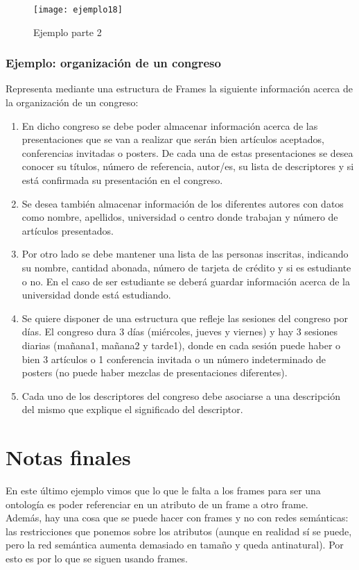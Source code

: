 \documentclass[12pt]{article}
\begin{document}
\begin{figure}[H]
\centering
\texttt{[image: ejemplo18]}
\caption{Ejemplo parte 2}
\label{fig:ejemplo18}
\end{figure}

\subsubsection{Ejemplo: organización de un congreso}
Representa mediante una estructura de Frames la siguiente información acerca de la organización de un congreso:
\begin{enumerate}
\item En dicho congreso se debe poder almacenar información acerca de las presentaciones que se van a realizar que serán bien artículos aceptados, conferencias invitadas o posters. De cada una de estas presentaciones se desea conocer su títulos, número de referencia, autor/es, su lista de descriptores y si está confirmada su presentación en el congreso.
\item Se desea también almacenar información de los diferentes autores con datos como nombre, apellidos, universidad o centro donde trabajan y número de artículos presentados.
\item Por otro lado se debe mantener una lista de las personas inscritas, indicando su nombre, cantidad abonada, número de tarjeta de crédito y si es estudiante o no. En el caso de ser estudiante se deberá guardar información acerca de la universidad donde está estudiando.
\item Se quiere disponer de una estructura que refleje las sesiones del congreso por días. El congreso dura 3 días (miércoles, jueves y viernes) y hay 3 sesiones diarias (mañana1, mañana2 y tarde1), donde en cada sesión puede haber o bien 3 artículos o 1 conferencia invitada o un número indeterminado de posters (no puede haber mezclas de presentaciones diferentes).
\item Cada uno de los descriptores del congreso debe asociarse a una descripción del mismo que explique el significado del descriptor.
\end{enumerate}

\section{Notas finales}
En este último ejemplo vimos que lo que le falta a los frames para ser una ontología es poder referenciar en un atributo de un frame a otro frame.\\
Además, hay una cosa que se puede hacer con frames y no con redes semánticas: las restricciones que ponemos sobre los atributos (aunque en realidad sí se puede, pero la red semántica aumenta demasiado en tamaño y queda antinatural). Por esto es por lo que se siguen usando frames.
\end{document}
